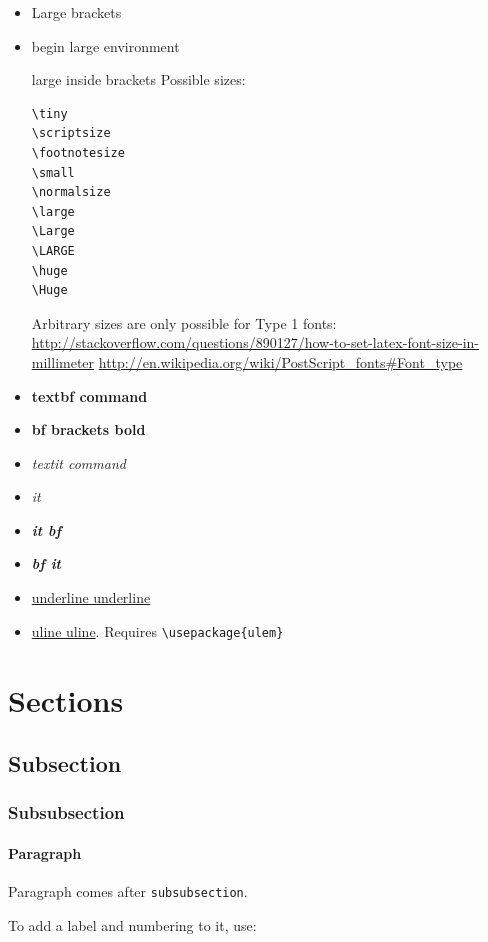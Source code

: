 \documentclass[12pt]{article}
\begin{document}
\begin{itemize}
\item {\Large Large brackets}
\item
\begin{Large}begin large environment\end{Large}
{\Large large inside brackets}
Possible sizes:
\begin{lstlisting}
\tiny
\scriptsize
\footnotesize
\small
\normalsize
\large
\Large
\LARGE
\huge
\Huge
\end{lstlisting}

Arbitrary sizes are only possible for Type 1 fonts: \url{http://stackoverflow.com/questions/890127/how-to-set-latex-font-size-in-millimeter}
\url{http://en.wikipedia.org/wiki/PostScript_fonts#Font_type}
\item \textbf{textbf command}
\item {\bf bf brackets bold}
\item \textit{textit command}
\item {\it it}
\item {\it \bf it bf}
\item {\bf \it bf it}
\item \underline{underline underline}
\item \uline{uline uline}. Requires \lstinline|\usepackage{ulem}|
\end{itemize}

\section{Sections}\label{sections}

\subsection{Subsection}\label{subsection}

\subsubsection{Subsubsection}\label{subsubsection}

\paragraph{Paragraph}\label{paragraph}

Paragraph comes after \lstinline|subsubsection|.

To add a label and numbering to it, use:
\end{document}
